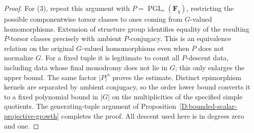 \begin{proof}
For (3), repeat this argument with
$P=\operatorname{PGL}_r(\mathbf F_q)$, restricting the possible
componentwise torsor classes to ones coming from $G$-valued
homomorphisms.  Extension of structure group identifies equality
of the resulting $P$-torsor classes precisely with ambient
$P$-conjugacy.  This is an equivalence relation on the original
$G$-valued homomorphisms even when $P$ does not normalize $G$.
For a fixed tuple it is legitimate to count all $P$-descent data,
including data whose final monodromy does not lie in $G$; this
only enlarges the upper bound.  The same factor $|P|^a$ proves
the estimate.  Distinct epimorphism kernels are separated by
ambient conjugacy, so the order lower bound converts it to a
fixed polynomial bound in $|G|$ on the multiplicities of the
specified simple quotients.  The generating-tuple argument of
Proposition~\ref{D:bounded-scalar-projective-growth} completes the
proof.  All descent used here is in degrees zero and one.
\end{proof}
